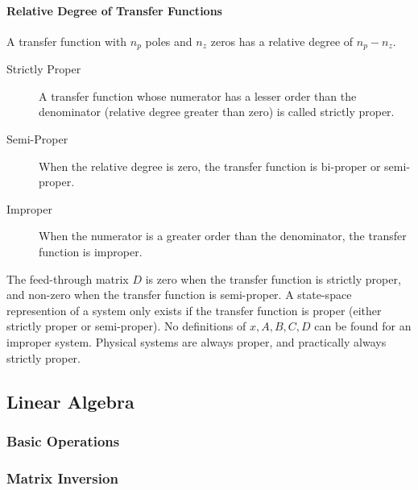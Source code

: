 \documentclass[../notes.tex]{subfiles}
\begin{document}
\paragraph{Relative Degree of Transfer Functions}
A transfer function with $n_p$ poles and $n_z$ zeros has a relative degree of $n_p - n_z$. \\
\begin{description}
    \item[Strictly Proper] A transfer function whose numerator has a lesser order than the denominator (relative degree greater than zero) is called strictly proper.
    \item[Semi-Proper] When the relative degree is zero, the transfer function is bi-proper or semi-proper.
    \item[Improper] When the numerator is a greater order than the denominator, the transfer function is improper. 
\end{description}
The feed-through matrix $D$ is zero when the transfer function is strictly proper, and non-zero when the transfer function is semi-proper. A state-space represention of a system only exists if the transfer function is proper (either strictly proper or semi-proper). No definitions of $x, A, B, C, D$ can be found for an improper system. Physical systems are always proper, and practically always strictly proper.

\subsection{Linear Algebra}
\subsubsection{Basic Operations}
\subsubsection{Matrix Inversion}
\end{document}
